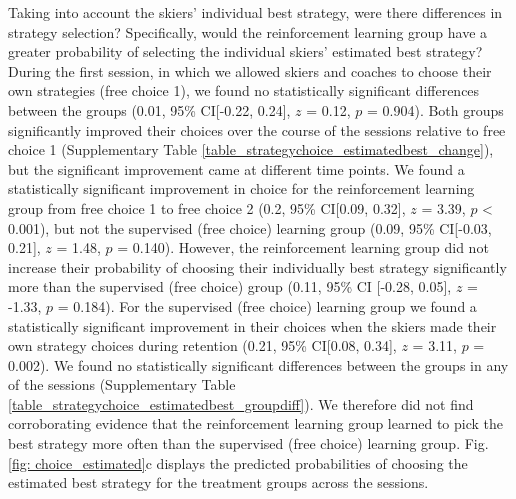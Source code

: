 \documentclass[pdflatex,sn-nature]{sn-jnl}%
\theoremstyle{thmstyleone}%
\theoremstyle{thmstyletwo}%
\theoremstyle{thmstylethree}%
\begin{document}
Taking into account the skiers' individual best strategy, were there differences in strategy selection? Specifically, would the reinforcement learning group have a greater probability of selecting the individual skiers' estimated best strategy? During the first session, in which we allowed skiers and coaches to choose their own strategies (free choice 1),  we found no statistically significant differences between the groups (0.01, 95\% CI[-0.22, 0.24], $z$ = 0.12, $p$ = 0.904). Both groups significantly improved their choices over the course of the sessions relative to free choice 1 (Supplementary Table \ref{table_strategychoice_estimatedbest_change}), but the significant improvement came at different time points. We found a statistically significant improvement in choice for the reinforcement learning group from free choice 1 to free choice 2 (0.2, 95\% CI[0.09, 0.32], $z$ = 3.39, $p$ < 0.001), but not the supervised (free choice) learning group (0.09, 95\% CI[-0.03, 0.21], $z$ = 1.48, $p$ = 0.140). However, the reinforcement learning group did not increase their probability of choosing their individually best strategy significantly more than the supervised (free choice) group (0.11, 95\% CI [-0.28, 0.05], $z$ = -1.33, $p$ = 0.184). For the supervised (free choice) learning group we found a statistically significant improvement in their choices when the skiers made their own strategy choices during retention (0.21, 95\% CI[0.08, 0.34], $z$ = 3.11, $p$  =  0.002). We found no statistically significant differences between the groups in any of the sessions (Supplementary Table \ref{table_strategychoice_estimatedbest_groupdiff}). We therefore did not find corroborating evidence that the reinforcement learning group learned to pick the best strategy more often than the supervised (free choice) learning group. Fig. \ref{fig: choice_estimated}c displays the predicted probabilities of choosing the estimated best strategy for the treatment groups across the sessions.
\end{document}
